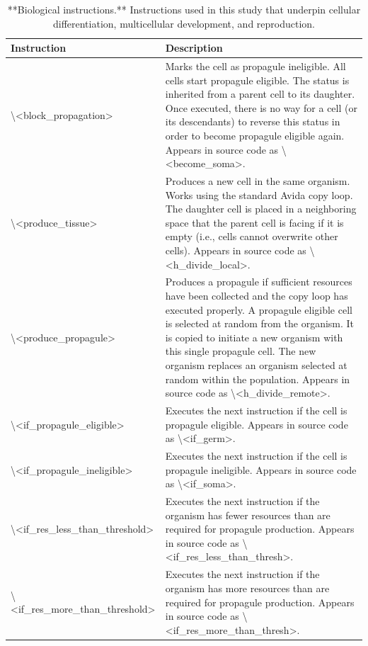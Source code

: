 \documentclass[
]{book}
\begin{document}
\begin{table}
\caption{\label{tab:Avida-instructions-Biological-Table}**Biological instructions.** Instructions used in this study that underpin cellular differentiation, multicellular development, and reproduction.}
\centering
\begin{tabular}[t]{ll}
\toprule
Instruction & Description\\
\midrule
\textbackslash{}<block\_propagation> & Marks the cell as propagule ineligible. All cells start propagule eligible. The status is inherited from a parent cell to its daughter. Once executed, there is no way for a cell (or its descendants) to reverse this status in order to become propagule eligible again. Appears in source code as \textbackslash{}<become\_soma>.\\
\textbackslash{}<produce\_tissue> & Produces a new cell in the same organism. Works using the standard Avida copy loop. The daughter cell is placed in a neighboring space that the parent cell is facing if it is empty (i.e., cells cannot overwrite other cells). Appears in source code as \textbackslash{}<h\_divide\_local>.\\
\textbackslash{}<produce\_propagule> & Produces a propagule if sufficient resources have been collected and the copy loop has executed properly. A propagule eligible cell is selected at random from the organism. It is copied to initiate a new organism with this single propagule cell. The new organism replaces an organism selected at random within the population. Appears in source code as \textbackslash{}<h\_divide\_remote>.\\
\textbackslash{}<if\_propagule\_eligible> & Executes the next instruction if the cell is propagule eligible. Appears in source code as \textbackslash{}<if\_germ>.\\
\textbackslash{}<if\_propagule\_ineligible> & Executes the next instruction if the cell is propagule ineligible. Appears in source code as \textbackslash{}<if\_soma>.\\
\addlinespace
\textbackslash{}<if\_res\_less\_than\_threshold> & Executes the next instruction if the organism has fewer resources than are required for propagule production. Appears in source code as \textbackslash{}<if\_res\_less\_than\_thresh>.\\
\textbackslash{}<if\_res\_more\_than\_threshold> & Executes the next instruction if the organism has more resources than are required for propagule production. Appears in source code as \textbackslash{}<if\_res\_more\_than\_thresh>.\\
\bottomrule
\end{tabular}
\end{table}
\end{document}

